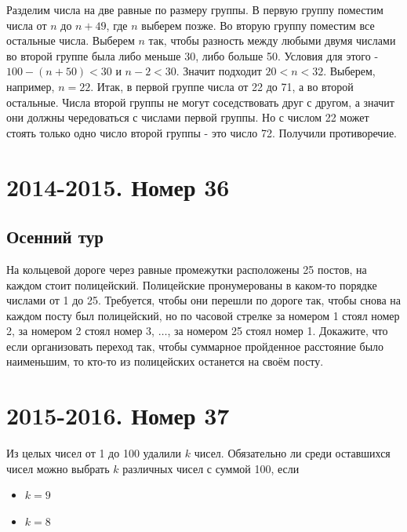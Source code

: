 \documentclass[11pt, a4paper]{common/document_template}
\begin{document}
\begin{Solution}
Разделим числа на две равные по размеру группы. В первую группу поместим числа от $n$ до $n + 49$, где $n$ выберем позже. Во вторую группу поместим все остальные числа. Выберем $n$ так, чтобы разность между любыми двумя числами во второй группе была либо меньше 30, либо больше 50. Условия для этого - $100 - (n + 50) < 30$ и $n - 2 < 30$. Значит подходит $20 < n < 32$. Выберем, например, $n = 22$. Итак, в первой группе числа от 22 до 71, а во второй остальные. Числа второй группы не могут соседствовать друг с другом, а значит они должны чередоваться с числами первой группы. Но с числом 22 может стоять только одно число второй группы - это число 72. Получили противоречие.
\end{Solution}

\chapter{2014-2015. Номер 36}

\section{Осенний тур}

\begin{exercise}
На кольцевой дороге через равные промежутки расположены 25 постов, на каждом стоит полицейский. Полицейские пронумерованы в каком-то порядке числами от 1 до 25. Требуется, чтобы они перешли по дороге так, чтобы снова на каждом посту был полицейский, но по часовой стрелке за номером 1 стоял номер 2, за номером 2 стоял номер 3, $\dots$, за номером 25 стоял номер 1. Докажите, что если организовать переход так, чтобы суммарное пройденное расстояние было наименьшим, то кто-то из полицейских останется
на своём посту.
\end{exercise}

\chapter{2015-2016. Номер 37}

\begin{exercise}
Из целых чисел от 1 до 100 удалили $k$ чисел. Обязательно ли среди оставшихся чисел можно выбрать $k$ различных чисел с суммой 100, если
\begin{itemize}
\item $k = 9$
\item $k = 8$
\end{itemize}
\end{exercise}
\end{document}
